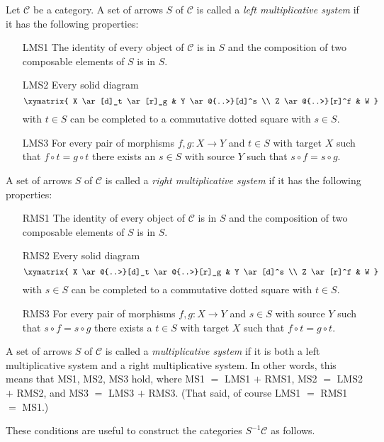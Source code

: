 \begin{definition}
\label{definition-multiplicative-system}
Let $\mathcal{C}$ be a category. A set of arrows $S$ of $\mathcal{C}$ is
called a {\it left multiplicative system} if it has the following properties:
\begin{enumerate}
\item[LMS1] The identity of every object of $\mathcal{C}$ is in $S$ and
the composition of two composable elements of $S$ is in $S$.
\item[LMS2] Every solid diagram
$$
\xymatrix{
X \ar[d]_t \ar[r]_g & Y \ar@{..>}[d]^s \\
Z \ar@{..>}[r]^f & W
}
$$
with $t \in S$ can be completed to a commutative dotted square with
$s \in S$.
\item[LMS3] For every pair of morphisms $f, g : X \to Y$ and
$t \in S$ with target $X$ such that $f \circ t = g \circ t$
there exists an $s \in S$ with source $Y$ such that
$s \circ f = s \circ g$.
\end{enumerate}
A set of arrows $S$ of $\mathcal{C}$ is
called a {\it right multiplicative system}
if it has the following properties:
\begin{enumerate}
\item[RMS1] The identity of every object of $\mathcal{C}$ is in $S$ and
the composition of two composable elements of $S$ is in $S$.
\item[RMS2] Every solid diagram
$$
\xymatrix{
X \ar@{..>}[d]_t \ar@{..>}[r]_g & Y \ar[d]^s \\
Z \ar[r]^f & W
}
$$
with $s \in S$ can be completed to a commutative dotted square with
$t \in S$.
\item[RMS3] For every pair of morphisms $f, g : X \to Y$ and
$s \in S$ with source $Y$ such that $s \circ f = s \circ g$
there exists a $t \in S$ with target $X$ such that
$f \circ t = g \circ t$.
\end{enumerate}
A set of arrows $S$ of $\mathcal{C}$ is called a {\it multiplicative system}
if it is both a left multiplicative system and a right multiplicative system.
In other words, this means that MS1, MS2, MS3 hold, where
MS1 $=$ LMS1 $+$ RMS1, MS2 $=$ LMS2 $+$ RMS2, and
MS3 $=$ LMS3 $+$ RMS3. (That said, of course LMS1 $=$ RMS1
$=$ MS1.)
\end{definition}

\noindent
These conditions are useful to construct the categories $S^{-1}\mathcal{C}$
as follows.

